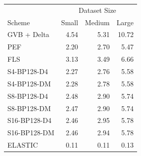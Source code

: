 \begin{tabular}{lrrr}
\toprule
 & \multicolumn{3}{c}{Dataset Size} \\
Scheme & Small & Medium & Large \\
\midrule
GVB + Delta & 4.54 & 5.31 & 10.72 \\
PEF & 2.20 & 2.70 & 5.47 \\
FLS & 3.13 & 3.49 & 6.66 \\
S4-BP128-D4 & 2.27 & 2.76 & 5.58 \\
S4-BP128-DM & 2.28 & 2.78 & 5.58 \\
S8-BP128-D4 & 2.48 & 2.90 & 5.74 \\
S8-BP128-DM & 2.47 & 2.90 & 5.74 \\
S16-BP128-D4 & 2.46 & 2.95 & 5.78 \\
S16-BP128-DM & 2.46 & 2.94 & 5.78 \\
ELASTIC & 0.11 & 0.11 & 0.13 \\
\bottomrule
\end{tabular}

